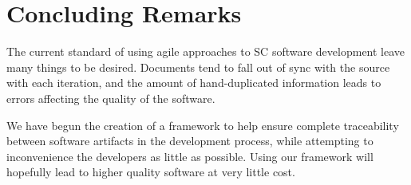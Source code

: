 \documentclass{sig-alternate-05-2015}
\begin{document}
    
\section{Concluding Remarks} \label{sec:conclusion}

The current standard of using agile approaches to SC software development leave
many things to be desired. Documents tend to fall out of sync with the source
with each iteration, and the amount of hand-duplicated information leads to
errors affecting the quality of the software.

We have begun the creation of a framework to help ensure complete traceability
between software artifacts in the development process, while attempting to
inconvenience the developers as little as possible. Using our framework will
hopefully lead to higher quality software at very little cost.


  
\end{document}
